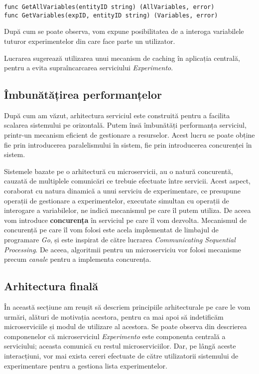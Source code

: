 \begin{center}
	\begin{lstlisting}[language=proto3]
func GetAllVariables(entityID string) (AllVariables, error)
func GetVariables(expID, entityID string) (Variables, error)
	\end{lstlisting}
\end{center}

După cum se poate observa, vom expune posibilitatea de a interoga variabilele tuturor experimentelor din care face parte un utilizator.

\begin{remark}
	Lucrarea sugerează utilizarea unui mecanism de caching în aplicația centrală, pentru a evita supraîncarcarea serviciului \textit{Experimento}.
\end{remark}

\subsection{Îmbunătățirea performanțelor}

După cum am văzut, arhitectura serviciul este construită pentru a facilita scalarea sistemului pe orizontală. Putem însă îmbunătăți performanța serviciul, printr-un mecanism eficient de gestionare a resurselor. Acest lucru se poate obține fie prin introducerea paralelismului în sistem, fie prin introducerea concurenței în sistem. 

Sistemele bazate pe o arhitectură cu microservicii, au o natură concurentă, cauzată de multiplele comunicări ce trebuie efectuate între servicii. Acest aspect, coraborat cu natura dinamică a unui serviciu de experimentare, ce presupune operații de gestionare a experimentelor, executate simultan cu operații de interogare a variabilelor, ne indică mecanismul pe care îl putem utiliza. De aceea vom introduce \textbf{concurența} în serviciul pe care îl vom dezvolta. Mecanismul de concurență pe care îl vom folosi este acela implementat de limbajul de programare \textit{Go}, și este inspirat de către lucrarea \textit{Communicating Sequential Processing}\cite{hoare_csp}. De aceea, algoritmii pentru un microserviciu vor folosi mecanisme precum \textit{canale} pentru a implementa concurența.

\subsection{Arhitectura finală}

În această secțiune am reușit să descriem principiile arhitecturale pe care le vom urmări, alături de motivația acestora, pentru ca mai apoi să indetificăm microserviciile și modul de utilizare al acestora. Se poate observa din descrierea componenelor că microserviciul \textit{Experimento} este componenta centrală a serviciului; aceasta comunică cu restul microserviciilor. Dar, pe lângă aceste interacțiuni, vor mai exista cereri efectuate de către utilizatorii sistemului de experimentare pentru a gestiona lista experimentelor. 

